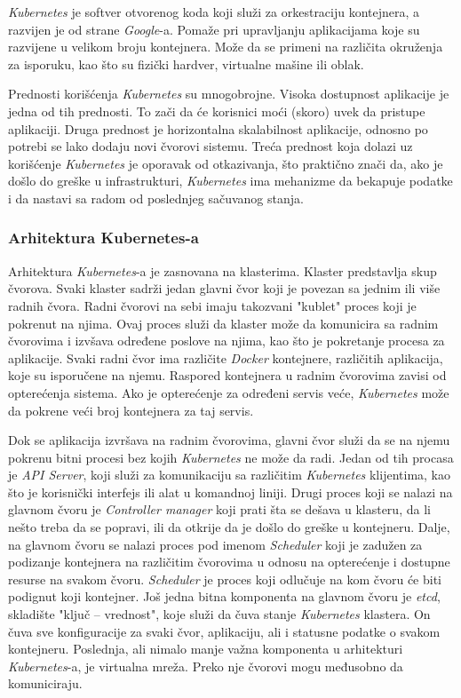 \textit{Kubernetes} je softver otvorenog koda koji služi za orkestraciju kontejnera, a razvijen je od 
strane \textit{Google}-a. Pomaže pri upravljanju aplikacijama koje su razvijene u velikom broju 
kontejnera. Može da se primeni na različita okruženja za isporuku, kao što su fizički 
hardver, virtualne mašine ili oblak.

Prednosti korišćenja \textit{Kubernetes} su mnogobrojne. Visoka dostupnost aplikacije je jedna od tih prednosti. 
To zači da će korisnici moći (skoro) uvek da pristupe aplikaciji. Druga prednost je horizontalna 
skalabilnost aplikacije, odnosno po potrebi se lako dodaju novi čvorovi sistemu. Treća prednost koja 
dolazi uz korišćenje \textit{Kubernetes} je oporavak od otkazivanja, što praktično znači da, ako je došlo do 
greške u infrastrukturi, \textit{Kubernetes} ima mehanizme da bekapuje podatke i da nastavi sa radom od 
poslednjeg sačuvanog stanja.

\subsubsection{Arhitektura Kubernetes-a}
Arhitektura \textit{Kubernetes}-a je zasnovana na klasterima. Klaster predstavlja skup čvorova. Svaki klaster sadrži
jedan glavni čvor koji je povezan sa jednim ili više radnih čvora. Radni čvorovi na sebi imaju 
takozvani "kublet" proces koji je pokrenut na njima. Ovaj proces služi da klaster može da komunicira
sa radnim čvorovima i izvšava određene poslove na njima, kao što je pokretanje procesa za aplikacije.
Svaki radni čvor ima različite \textit{Docker} kontejnere, različitih aplikacija, koje su isporučene na njemu.
Raspored kontejnera u radnim čvorovima zavisi od opterećenja sistema. Ako je opterećenje za određeni 
servis veće, \textit{Kubernetes} može da pokrene veći broj kontejnera za taj servis. 

Dok se aplikacija izvršava na radnim čvorovima, glavni čvor služi da se na njemu pokrenu bitni procesi 
bez kojih \textit{Kubernetes} ne može da radi. Jedan od tih procasa je {\em API Server}, koji služi za 
komunikaciju sa različitim \textit{Kubernetes} klijentima, kao što je korisnički interfejs ili alat u 
komandnoj liniji. Drugi proces koji se nalazi na glavnom čvoru je {\em Controller manager} koji 
prati šta se dešava u klasteru, da li nešto treba da se popravi, ili da otkrije da je došlo do greške 
u kontejneru. Dalje, na glavnom čvoru se nalazi proces pod imenom {\em Scheduler} koji je zadužen 
za podizanje kontejnera na različitim čvorovima u odnosu na opterećenje i dostupne resurse na svakom 
čvoru. \textit{Scheduler} je proces koji odlučuje na kom čvoru će biti podignut koji kontejner. 
Još jedna bitna komponenta na glavnom čvoru je {\em etcd}, skladište "ključ -- vrednost", koje služi 
da čuva stanje \textit{Kubernetes} klastera. On čuva sve konfiguracije za svaki čvor, aplikaciju, ali i statusne 
podatke o svakom kontejneru. Poslednja, ali nimalo manje važna komponenta u arhitekturi \textit{Kubernetes}-a, 
je virtualna mreža. Preko nje čvorovi mogu međusobno da komuniciraju. 

